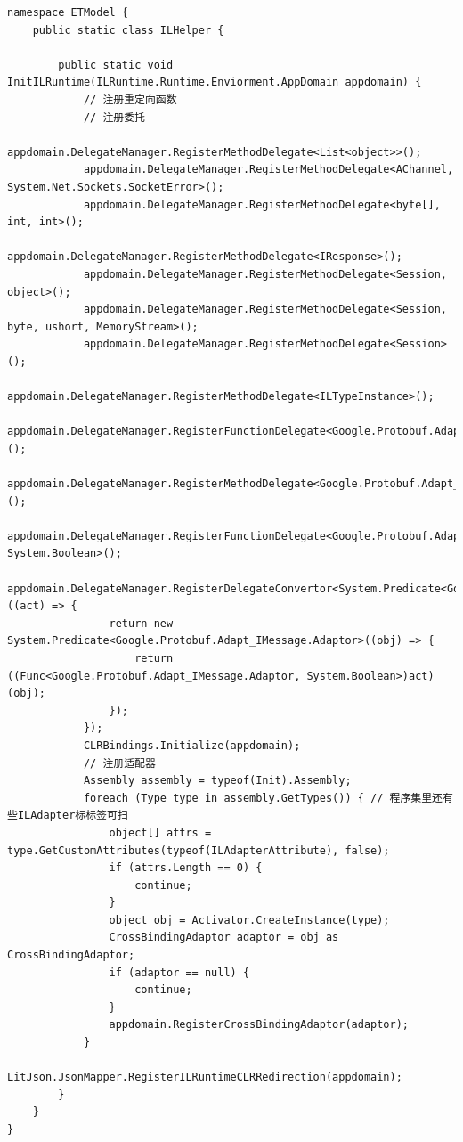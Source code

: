 \documentclass[9pt, b5paper]{article}
\begin{document}
\begin{verbatim}
namespace ETModel {
    public static class ILHelper {

        public static void InitILRuntime(ILRuntime.Runtime.Enviorment.AppDomain appdomain) {
            // 注册重定向函数
            // 注册委托
            appdomain.DelegateManager.RegisterMethodDelegate<List<object>>();
            appdomain.DelegateManager.RegisterMethodDelegate<AChannel, System.Net.Sockets.SocketError>();
            appdomain.DelegateManager.RegisterMethodDelegate<byte[], int, int>();
            appdomain.DelegateManager.RegisterMethodDelegate<IResponse>();
            appdomain.DelegateManager.RegisterMethodDelegate<Session, object>();
            appdomain.DelegateManager.RegisterMethodDelegate<Session, byte, ushort, MemoryStream>();
            appdomain.DelegateManager.RegisterMethodDelegate<Session>();
            appdomain.DelegateManager.RegisterMethodDelegate<ILTypeInstance>();
            appdomain.DelegateManager.RegisterFunctionDelegate<Google.Protobuf.Adapt_IMessage.Adaptor>();
            appdomain.DelegateManager.RegisterMethodDelegate<Google.Protobuf.Adapt_IMessage.Adaptor>();
            appdomain.DelegateManager.RegisterFunctionDelegate<Google.Protobuf.Adapt_IMessage.Adaptor, System.Boolean>();
            appdomain.DelegateManager.RegisterDelegateConvertor<System.Predicate<Google.Protobuf.Adapt_IMessage.Adaptor>>((act) => {
                return new System.Predicate<Google.Protobuf.Adapt_IMessage.Adaptor>((obj) => {
                    return ((Func<Google.Protobuf.Adapt_IMessage.Adaptor, System.Boolean>)act)(obj);
                });
            });
            CLRBindings.Initialize(appdomain);
            // 注册适配器
            Assembly assembly = typeof(Init).Assembly;
            foreach (Type type in assembly.GetTypes()) { // 程序集里还有些ILAdapter标标签可扫
                object[] attrs = type.GetCustomAttributes(typeof(ILAdapterAttribute), false);
                if (attrs.Length == 0) {
                    continue;
                }
                object obj = Activator.CreateInstance(type);
                CrossBindingAdaptor adaptor = obj as CrossBindingAdaptor;
                if (adaptor == null) {
                    continue;
                }
                appdomain.RegisterCrossBindingAdaptor(adaptor);
            }
            LitJson.JsonMapper.RegisterILRuntimeCLRRedirection(appdomain);
        }
    }
}
\end{verbatim}
\end{document}
